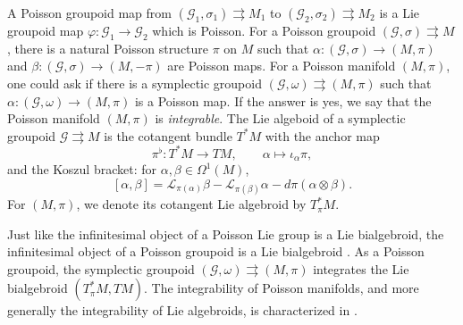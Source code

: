 \documentclass{amsart}
\newtheorem{example}[theorem]{Example}
\numberwithin{equation}{section}
\newcommand{\cG}{\mathcal{G}}
\newcommand{\cL}{\mathcal{L}}
\newcommand{\cO}{\mathcal{O}}
\newcommand{\rra}{\rightrightarrows}
\begin{document}
A Poisson groupoid map from $(\cG_1, \sigma_1) \rra M_1$ to $(\cG_2, \sigma_2) \rra M_2$ is a Lie groupoid map $\varphi: \cG_1 \to \cG_2$ which is Poisson.
For a Poisson groupoid $(\cG, \sigma) \rra M$, there is a natural Poisson structure $\pi$ on $M$ such that $\alpha: (\cG, \sigma) \to (M, \pi)$ and $\beta: (\cG, \sigma) \to (M, -\pi)$ are Poisson maps.
For a Poisson manifold $(M, \pi)$, one could ask if there is a symplectic groupoid $(\cG, \omega) \rra (M, \pi)$ such that $\alpha: (\cG, \omega) \to (M, \pi)$ is a Poisson map.
If the answer is yes, we say that the Poisson manifold $(M, \pi)$ is \emph{integrable}.
The Lie algeboid of a symplectic groupoid $\cG \rra M$ is the cotangent bundle $T^*M$ \cite{MR866024} with the anchor map
\[\pi^\flat: T^*M \to TM, \qquad \alpha \mapsto \iota_\alpha \pi,\]
and the Koszul bracket: for $\alpha, \beta \in \Omega^1(M)$,
\[[\alpha, \beta] = \cL_{\pi(\alpha)} \beta - \cL_{\pi(\beta)} \alpha - d\pi(\alpha \otimes \beta).\]
For $(M, \pi)$, we denote its cotangent Lie algebroid by $T^*_\pi M$.

Just like the infinitesimal object of a Poisson Lie group is a Lie bialgebroid, the infinitesimal object of a Poisson groupoid is a Lie bialgebroid \cite{MR1262213}.
As a Poisson groupoid, the symplectic groupoid $(\cG, \omega) \rra (M, \pi)$ integrates the Lie bialgebroid $(T^*_\pi M, TM)$.
The integrability of Poisson manifolds, and more generally the integrability of Lie algebroids, is characterized in \cite{MR1973056, MR2128714}.

\end{document}
